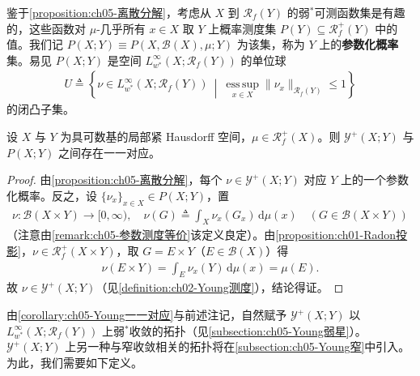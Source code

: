 \documentclass[../../main.tex]{subfiles}%
\begin{document}
鉴于\cref{proposition:ch05-离散分解}，考虑从 $X$ 到 $\mathscr{R}_f(Y)$ 的弱$^*$可测函数集是有趣的，这些函数对 $\mu$-几乎所有 $x\in X$ 取 $Y$ 上概率测度集 $P(Y)\subseteq\mathscr{R}^+_f(Y)$ 中的值。我们记 $P(X;Y)\equiv P(X,\mathscr{B}(X),\mu;Y)$ 为该集，称为 $Y$ 上的\textbf{参数化概率}集。易见 $P(X;Y)$ 是空间 $L^\infty_{w^*}(X;\mathscr{R}_f(Y))$ 的单位球
\begin{align}
U\triangleq \left\{\nu\in L^\infty_{w^*}(X;\mathscr{R}_f(Y))\ \middle|\
\operatorname*{ess\,sup}_{x\in X}\|\nu_x\|_{\mathscr{R}_f(Y)}\leqslant1\right\}\label{align:ch05-5.55}
\end{align}
的闭凸子集。

\begin{corollary}\label{corollary:ch05-Young一一对应}
设 $X$ 与 $Y$ 为具可数基的局部紧 Hausdorff 空间，$\mu\in\mathscr{R}^+_f(X)$。则 $\mathcal{Y}^+(X;Y)$ 与 $P(X;Y)$ 之间存在一一对应。
\end{corollary}

\begin{proof}
由\cref{proposition:ch05-离散分解}，每个 $\nu\in\mathcal{Y}^+(X;Y)$ 对应 $Y$ 上的一个参数化概率。反之，设 $\{\nu_x\}_{x\in X}\in P(X;Y)$，置
\begin{align*}
\nu:\mathscr{B}(X\times Y)\to[0,\infty),\quad
\nu(G)\triangleq \int_X\nu_x(G_x)\,\mathrm{d}\mu(x)
\quad(G\in\mathscr{B}(X\times Y))
\end{align*}
（注意由\cref{remark:ch05-参数测度等价}该定义良定）。由\cref{proposition:ch01-Radon投影}，$\nu\in\mathscr{R}^+_f(X\times Y)$，取 $G=E\times Y$（$E\in\mathscr{B}(X)$）得
\begin{align*}
\nu(E\times Y)=\int_E\nu_x(Y)\,\mathrm{d}\mu(x)=\mu(E).
\end{align*}
故 $\nu\in\mathcal{Y}^+(X;Y)$（见\cref{definition:ch02-Young测度}），结论得证。
\end{proof}

由\cref{corollary:ch05-Young一一对应}与前述注记，自然赋予 $\mathcal{Y}^+(X;Y)$ 以 $L^\infty_{w^*}(X;\mathscr{R}_f(Y))$ 上弱$^*$收敛的拓扑（见\cref{subsection:ch05-Young弱星}）。$\mathcal{Y}^+(X;Y)$ 上另一种与窄收敛相关的拓扑将在\cref{subsection:ch05-Young窄}中引入。为此，我们需要如下定义。
\end{document}
